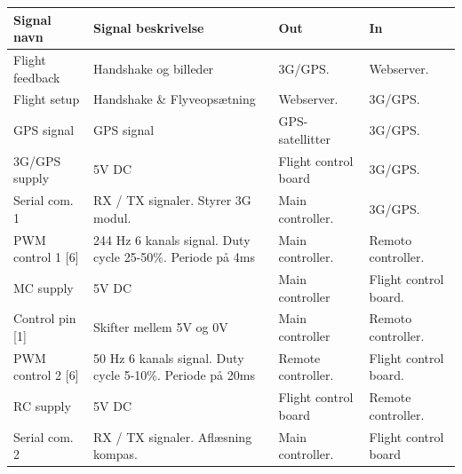 \begin{table}[H]
	\centering
		\begin{tabular}	{|p{3.1 cm}|p{5.2 cm}|p{2.3 cm}|p{2.3 cm}|}  
								
		\hline
			\textbf{Signal navn} 	& \textbf{Signal beskrivelse}		& \textbf{Out} 		& \textbf{In}     \\ \hline
			Flight feedback		& Handshake og billeder				& 3G/GPS.				& Webserver.	\\ \hline
			Flight setup		& Handshake \& Flyveopsætning  		& Webserver.			& 3G/GPS.	\\ \hline
			GPS signal	 		& GPS signal						& GPS-satellitter		& 3G/GPS.	\\ \hline			
			3G/GPS supply		& 5V DC							 	& Flight control board	& 3G/GPS.    \\ \hline
			Serial com. 1		& RX / TX signaler. \newline Styrer 3G modul.& Main \newline controller. 		& 3G/GPS.    \\ \hline
			
			
			PWM control 1 [6]	& 244 Hz 6 kanals signal. Duty \newline cycle 25-50\%. Periode på 4ms	& Main \newline controller.	& Remoto \newline controller.	\\ \hline
			MC supply		& 5V DC							 	& Main \newline controller	& Flight control board.    \\ \hline
			Control pin [1]		& Skifter mellem 5V og 0V							 	& Main \newline controller	& Remoto \newline  controller.    \\ \hline
			
			PWM control 2 [6]	& 50 Hz 6 kanals signal. Duty \newline cycle 5-10\%. Periode på 20ms	& Remote \newline controller.	& Flight control board.	\\ \hline		RC supply			& 5V DC							 	& Flight control board	& Remote \newline controller.    \\ \hline
			Serial com. 2		& RX / TX signaler. \newline Aflæsning kompas. & Main \newline controller.	& Flight control board	\\ \hline 	
			

\end{tabular}
\end{table}
